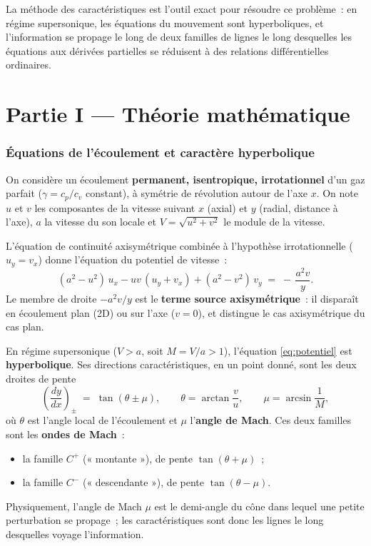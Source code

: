 \documentclass[11pt,a4paper]{article}
\newcommand{\ppar}[1]{\left(#1\right)}
\begin{document}
La méthode des caractéristiques est l'outil exact pour résoudre ce problème~:
en régime supersonique, les équations du mouvement sont hyperboliques, et
l'information se propage le long de deux familles de lignes le long desquelles
les équations aux dérivées partielles se réduisent à des relations
différentielles ordinaires.

\part*{Partie I --- Théorie mathématique}

\section{Équations de l'écoulement et caractère hyperbolique}

On considère un écoulement \textbf{permanent, isentropique, irrotationnel} d'un
gaz parfait ($\gamma = c_p/c_v$ constant), à symétrie de révolution autour de
l'axe $x$. On note $u$ et $v$ les composantes de la vitesse suivant $x$ (axial)
et $y$ (radial, distance à l'axe), $a$ la vitesse du son locale et
$V = \sqrt{u^2+v^2}$ le module de la vitesse.

L'équation de continuité axisymétrique combinée à l'hypothèse irrotationnelle
($u_y = v_x$) donne l'équation du potentiel de vitesse~:
\begin{equation}
  (a^2 - u^2)\,u_x - u v\,(u_y + v_x) + (a^2 - v^2)\,v_y
  \;=\; -\,\frac{a^2 v}{y}.
  \label{eq:potentiel}
\end{equation}
Le membre de droite $-a^2 v / y$ est le \textbf{terme source axisymétrique}~:
il disparaît en écoulement plan (2D) ou sur l'axe ($v=0$), et distingue le cas
axisymétrique du cas plan.

En régime supersonique ($V>a$, soit $M=V/a>1$), l'équation
\eqref{eq:potentiel} est \textbf{hyperbolique}. Ses directions
caractéristiques, en un point donné, sont les deux droites de pente
\begin{equation}
  \ppar{\frac{dy}{dx}}_{\!\pm} \;=\; \tan(\theta \pm \mu),
  \qquad
  \theta = \arctan\!\frac{v}{u},
  \qquad
  \mu = \arcsin\!\frac{1}{M},
  \label{eq:pentes}
\end{equation}
où $\theta$ est l'angle local de l'écoulement et $\mu$ l'\textbf{angle de Mach}.
Ces deux familles sont les \textbf{ondes de Mach}~:
\begin{itemize}[nosep]
  \item la famille $C^{+}$ (« montante »), de pente $\tan(\theta+\mu)$~;
  \item la famille $C^{-}$ (« descendante »), de pente $\tan(\theta-\mu)$.
\end{itemize}
Physiquement, l'angle de Mach $\mu$ est le demi-angle du cône dans lequel une
petite perturbation se propage~; les caractéristiques sont donc les lignes le
long desquelles voyage l'information.
\end{document}

